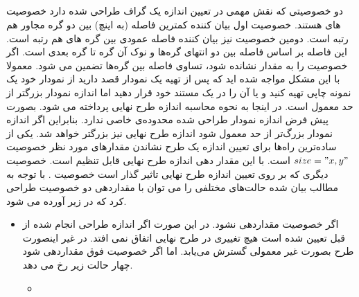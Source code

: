 \subsection{}
دو خصوصیتی که نقش مهمی در تعیین اندازه یک گراف طراحی شده  دارد خصوصیت
های  هستند. خصوصیت اول بیان کننده کمترین فاصله (به اینچ)
بین دو گره مجاور هم رتبه است. دومین خصوصیت نیز بیان کننده فاصله عمودی بین
گره های هم رتبه است. این فاصله بر اساس فاصله بین دو انتهای گره‌ها و نوک آن گره
تا گره بعدی است. اگر خصوصیت  را به مقدار  نشانده شود،
تساوی فاصله بین گره‌ها تضمین می شود. معمولا با این مشکل مواجه شده اید که پس از
تهیه یک نمودار قصد دارید از نمودار خود یک نمونه چاپی تهیه کنید و یا آن را در یک
مستند خود قرار دهید اما اندازه نمودار بزرگتر از حد معمول است. در اینجا به نحوه
محاسبه اندازه طرح نهایی پرداخته می شود.
بصورت پیش فرض اندازه نمودار طراحی شده محدوده‌ی خاصی ندارد. بنابراین اگر اندازه
نمودار بزرگ‌تر از حد معمول شود اندازه طرح نهایی نیز بزرگتر خواهد شد.
یکی از ساده‌ترین راه‌ها برای تعیین اندازه یک طرح نشاندن مقدارهای مورد نظر
خصوصیت $size="x,y"$ است. با این مقدار دهی اندازه طرح نهایی قابل تنظیم است.
خصوصیت دیگری که بر روی تعیین اندازه طرح نهایی تاثیر گذار است خصوصیت .
با توجه به مطالب بیان شده حالت‌های مختلفی را می توان با مقداردهی دو خصوصیت
طراحی کرد که در زیر آورده می شود.
\begin{itemize}
 \item اگر خصوصیت  مقداردهی نشود. در این صورت اگر اندازه طراحی انجام
شده از قبل تعیین شده است هیچ تغییری در طرح نهایی اتفاق نمی افتد. در غیر اینصورت
طرح بصورت غیر معمولی گسترش می‌یابد. اما اگر خصوصیت فوق مقداردهی شود چهار حالت
زیر رخ می دهد.
\begin{itemize}
 \item 
\end{itemize}

\end{itemize}










